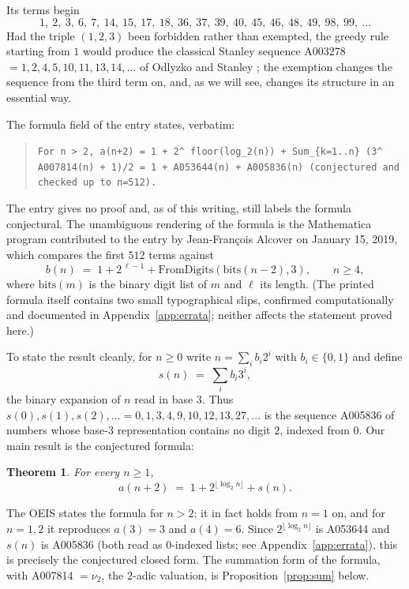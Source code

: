 \documentclass[12pt]{article}
\theoremstyle{plain}
\newtheorem{theorem}{Theorem}
\theoremstyle{definition}
\theoremstyle{remark}
\begin{document}
\noindent Its terms begin
\[
1,\ 2,\ 3,\ 6,\ 7,\ 14,\ 15,\ 17,\ 18,\ 36,\ 37,\ 39,\ 40,\ 45,\
46,\ 48,\ 49,\ 98,\ 99,\ \ldots
\]
Had the triple $(1,2,3)$ been forbidden rather than exempted, the
greedy rule starting from $1$ would produce the classical Stanley
sequence A003278 $=1,2,4,5,10,11,13,14,\ldots$ of Odlyzko and
Stanley \cite{OS1978}; the exemption changes the sequence from
the third term on, and, as we will see, changes its structure in
an essential way.

The formula field of the entry states, verbatim:

\begin{quote}
\texttt{For n > 2, a(n+2) = 1 + 2\textasciicircum
floor(log\_2(n)) + Sum\_\{k=1..n\} (3\textasciicircum
A007814(n) + 1)/2 = 1 + A053644(n) + A005836(n) (conjectured and
checked up to n=512).}
\end{quote}

\noindent The entry gives no proof and, as of this writing, still
labels the formula conjectural.  The unambiguous rendering of the
formula is the Mathematica program contributed to the entry by
Jean-Fran\c{c}ois Alcover on January 15, 2019, which compares the
first $512$ terms against
\[
b(n) \;=\; 1 + 2^{\,\ell-1} + \mathrm{FromDigits}(\mathrm{bits}(n-2),3),
\qquad n \geq 4,
\]
where $\mathrm{bits}(m)$ is the binary digit list of $m$ and
$\ell$ its length.  (The printed formula itself contains two
small typographical slips, confirmed computationally and
documented in Appendix~\ref{app:errata}; neither affects the
statement proved here.)

To state the result cleanly, for $n\geq 0$ write
$n=\sum_i b_i 2^i$ with $b_i\in\{0,1\}$ and define
\[
s(n) \;=\; \sum_i b_i 3^i,
\]
the binary expansion of $n$ read in base $3$.  Thus
$s(0),s(1),s(2),\ldots = 0,1,3,4,9,10,12,13,27,\ldots$ is the
sequence A005836 of numbers whose base-$3$ representation contains
no digit $2$, indexed from $0$.  Our main result is the conjectured
formula:

\begin{theorem}\label{thm:main}
For every $n\geq 1$,
\[
a(n+2) \;=\; 1 + 2^{\lfloor\log_2 n\rfloor} + s(n).
\]
\end{theorem}

\noindent The OEIS states the formula for $n>2$; it in fact holds
from $n=1$ on, and for $n=1,2$ it reproduces $a(3)=3$ and
$a(4)=6$.  Since $2^{\lfloor\log_2 n\rfloor}$ is A053644 and
$s(n)$ is A005836 (both read as $0$-indexed lists; see
Appendix~\ref{app:errata}), this is precisely the conjectured
closed form.  The summation form of the formula, with A007814
$=\nu_2$, the $2$-adic valuation, is Proposition~\ref{prop:sum}
below.
\end{document}
